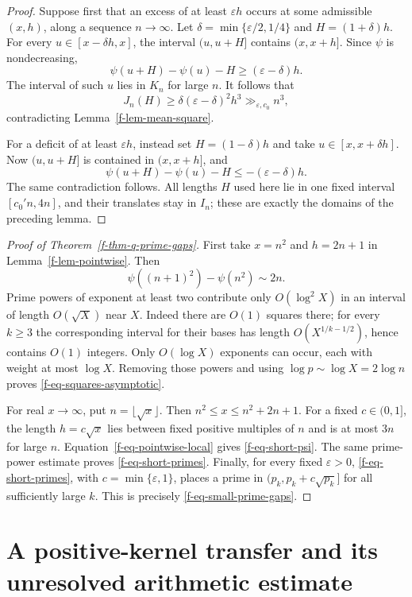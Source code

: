 \documentclass[11pt,a4paper]{article}
\theoremstyle{definition}
\theoremstyle{remark}
\begin{document}
\begin{proof}
Suppose first that an excess of at least $\varepsilon h$ occurs at some
admissible $(x,h)$, along a sequence $n\to\infty$.  Let
$\delta=\min\{\varepsilon/2,1/4\}$ and $H=(1+\delta)h$.
For every $u\in[x-\delta h,x]$, the interval $(u,u+H]$ contains
$(x,x+h]$.  Since $\psi$ is nondecreasing,
\[
 \psi(u+H)-\psi(u)-H\ge(\varepsilon-\delta)h.
\]
The interval of such $u$ lies in $K_n$ for large $n$.  It follows that
\[
 J_n(H)\ge\delta(\varepsilon-\delta)^2h^3\gg_{\varepsilon,c_0}n^3,
\]
contradicting Lemma~\ref{f-lem-mean-square}.

For a deficit of at least $\varepsilon h$, instead set
$H=(1-\delta)h$ and take $u\in[x,x+\delta h]$.  Now $(u,u+H]$ is
contained in $(x,x+h]$, and
\[
 \psi(u+H)-\psi(u)-H\le-(\varepsilon-\delta)h.
\]
The same contradiction follows.  All lengths $H$ used here lie in one
fixed interval $[c_0' n,4n]$, and their translates stay in $I_n$; these are
exactly the domains of the preceding lemma.
\end{proof}

\begin{proof}[Proof of Theorem~\ref{f-thm-q-prime-gaps}]
First take $x=n^2$ and $h=2n+1$ in
Lemma~\ref{f-lem-pointwise}.  Then
\[
 \psi((n+1)^2)-\psi(n^2)\sim2n.
\]
Prime powers of exponent at least two contribute only $O(\log^2X)$ in an
interval of length $O(\sqrt X)$ near $X$.  Indeed there are $O(1)$ squares
there; for every $k\ge3$ the corresponding interval for their bases has
length $O(X^{1/k-1/2})$, hence contains $O(1)$ integers.  Only $O(\log X)$
exponents can occur, each with weight at most $\log X$.  Removing those
powers and using $\log p\sim\log X=2\log n$ proves
\eqref{f-eq-squares-asymptotic}.

For real $x\to\infty$, put $n=\lfloor\sqrt x\rfloor$.  Then
$n^2\le x\le n^2+2n+1$.  For a fixed $c\in(0,1]$, the length
$h=c\sqrt x$ lies between fixed positive multiples of $n$ and is at most
$3n$ for large $n$.  Equation~\eqref{f-eq-pointwise-local} gives
\eqref{f-eq-short-psi}.  The same prime-power estimate proves
\eqref{f-eq-short-primes}.  Finally, for every fixed $\varepsilon>0$,
\eqref{f-eq-short-primes}, with $c=\min\{\varepsilon,1\}$, places a
prime in $(p_k,p_k+c\sqrt{p_k}]$ for all sufficiently large $k$.
This is precisely \eqref{f-eq-small-prime-gaps}.
\end{proof}

\section{A positive-kernel transfer and its unresolved arithmetic estimate}
\label{f-sec-transfer}
\end{document}
